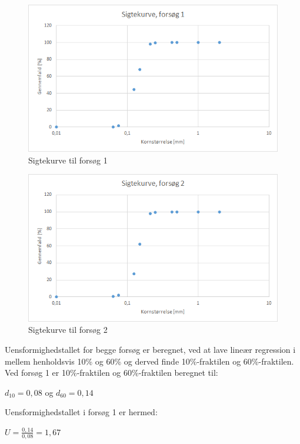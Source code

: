 \begin{figure}[htbp]
		\includegraphics[width=1.0\textwidth]{billeder/sigtekurve1.png}
		\caption{Sigtekurve til forsøg 1}
		\label{fig:sigtekurve1}
\end{figure}

\begin{figure}[htbp]
		\centering
		\includegraphics[width=1.0\textwidth]{billeder/sigtekurve2.png}
		\caption{Sigtekurve til forsøg 2}
		\label{fig:sigtekurve2}
\end{figure}

Uensformighedstallet for begge forsøg er beregnet, ved at lave lineær regression i mellem henholdsvis 10\% og 60\% og derved finde 10\%-fraktilen og 60\%-fraktilen.
\newline
\newline
Ved forsøg 1 er 10\%-fraktilen og 60\%-fraktilen beregnet til: 
\begin{center}
	$d_{10} = 0,\!08$ og $d_{60} = 0,\!14$
\end{center} 

Uensformighedstallet i forsøg 1 er hermed:
\begin{center}
	$U = \frac{0,\!14}{0,\!08} = 1,\!67$
\end{center}

